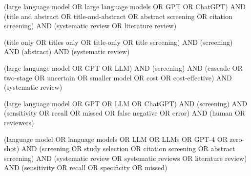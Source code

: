 \begin{description}[style=nextline,font=\normalfont\bfseries]
\item[q4a, support query] {\footnotesize\ttfamily\raggedright (\textquotedbl{}large language model\textquotedbl{} OR \textquotedbl{}large language models\textquotedbl{} OR GPT OR ChatGPT) AND (\textquotedbl{}title and abstract\textquotedbl{} OR \textquotedbl{}title-and-abstract\textquotedbl{} OR \textquotedbl{}abstract screening\textquotedbl{} OR \textquotedbl{}citation screening\textquotedbl{}) AND (\textquotedbl{}systematic review\textquotedbl{} OR \textquotedbl{}literature review\textquotedbl{})\par}
\item[q4b, support query] {\footnotesize\ttfamily\raggedright (\textquotedbl{}title only\textquotedbl{} OR \textquotedbl{}titles only\textquotedbl{} OR \textquotedbl{}title-only\textquotedbl{} OR \textquotedbl{}title screening\textquotedbl{}) AND (screening) AND (abstract) AND (\textquotedbl{}systematic review\textquotedbl{})\par}
\item[q4c, support query] {\footnotesize\ttfamily\raggedright (\textquotedbl{}large language model\textquotedbl{} OR GPT OR LLM) AND (screening) AND (cascade OR \textquotedbl{}two-stage\textquotedbl{} OR uncertain OR \textquotedbl{}smaller model\textquotedbl{} OR cost OR \textquotedbl{}cost-effective\textquotedbl{}) AND (\textquotedbl{}systematic review\textquotedbl{})\par}
\item[q4d, support query] {\footnotesize\ttfamily\raggedright (\textquotedbl{}large language model\textquotedbl{} OR GPT OR LLM OR ChatGPT) AND (screening) AND (sensitivity OR recall OR missed OR \textquotedbl{}false negative\textquotedbl{} OR error) AND (human OR reviewers)\par}
\item[q4e, support query] {\footnotesize\ttfamily\raggedright (\textquotedbl{}language model\textquotedbl{} OR \textquotedbl{}language models\textquotedbl{} OR LLM OR LLMs OR \textquotedbl{}GPT-4\textquotedbl{} OR \textquotedbl{}zero-shot\textquotedbl{}) AND (screening OR \textquotedbl{}study selection\textquotedbl{} OR \textquotedbl{}citation screening\textquotedbl{} OR \textquotedbl{}abstract screening\textquotedbl{}) AND (\textquotedbl{}systematic review\textquotedbl{} OR \textquotedbl{}systematic reviews\textquotedbl{} OR \textquotedbl{}literature review\textquotedbl{}) AND (sensitivity OR recall OR specificity OR missed)\par}

\end{description}
